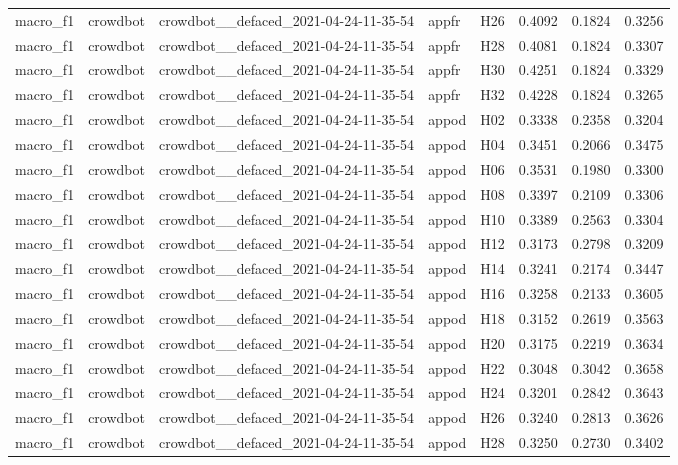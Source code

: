 \begin{table}[tbp]
\begin{tabular}{lllllrrr}
macro\_f1 & crowdbot & crowdbot\_\_defaced\_2021-04-24-11-35-54 & appfr & H26 & 0.4092 & 0.1824 & 0.3256 \\
macro\_f1 & crowdbot & crowdbot\_\_defaced\_2021-04-24-11-35-54 & appfr & H28 & 0.4081 & 0.1824 & 0.3307 \\
macro\_f1 & crowdbot & crowdbot\_\_defaced\_2021-04-24-11-35-54 & appfr & H30 & 0.4251 & 0.1824 & 0.3329 \\
macro\_f1 & crowdbot & crowdbot\_\_defaced\_2021-04-24-11-35-54 & appfr & H32 & 0.4228 & 0.1824 & 0.3265 \\
macro\_f1 & crowdbot & crowdbot\_\_defaced\_2021-04-24-11-35-54 & appod & H02 & 0.3338 & 0.2358 & 0.3204 \\
macro\_f1 & crowdbot & crowdbot\_\_defaced\_2021-04-24-11-35-54 & appod & H04 & 0.3451 & 0.2066 & 0.3475 \\
macro\_f1 & crowdbot & crowdbot\_\_defaced\_2021-04-24-11-35-54 & appod & H06 & 0.3531 & 0.1980 & 0.3300 \\
macro\_f1 & crowdbot & crowdbot\_\_defaced\_2021-04-24-11-35-54 & appod & H08 & 0.3397 & 0.2109 & 0.3306 \\
macro\_f1 & crowdbot & crowdbot\_\_defaced\_2021-04-24-11-35-54 & appod & H10 & 0.3389 & 0.2563 & 0.3304 \\
macro\_f1 & crowdbot & crowdbot\_\_defaced\_2021-04-24-11-35-54 & appod & H12 & 0.3173 & 0.2798 & 0.3209 \\
macro\_f1 & crowdbot & crowdbot\_\_defaced\_2021-04-24-11-35-54 & appod & H14 & 0.3241 & 0.2174 & 0.3447 \\
macro\_f1 & crowdbot & crowdbot\_\_defaced\_2021-04-24-11-35-54 & appod & H16 & 0.3258 & 0.2133 & 0.3605 \\
macro\_f1 & crowdbot & crowdbot\_\_defaced\_2021-04-24-11-35-54 & appod & H18 & 0.3152 & 0.2619 & 0.3563 \\
macro\_f1 & crowdbot & crowdbot\_\_defaced\_2021-04-24-11-35-54 & appod & H20 & 0.3175 & 0.2219 & 0.3634 \\
macro\_f1 & crowdbot & crowdbot\_\_defaced\_2021-04-24-11-35-54 & appod & H22 & 0.3048 & 0.3042 & 0.3658 \\
macro\_f1 & crowdbot & crowdbot\_\_defaced\_2021-04-24-11-35-54 & appod & H24 & 0.3201 & 0.2842 & 0.3643 \\
macro\_f1 & crowdbot & crowdbot\_\_defaced\_2021-04-24-11-35-54 & appod & H26 & 0.3240 & 0.2813 & 0.3626 \\
macro\_f1 & crowdbot & crowdbot\_\_defaced\_2021-04-24-11-35-54 & appod & H28 & 0.3250 & 0.2730 & 0.3402 \\

\end{tabular}
\end{table}
